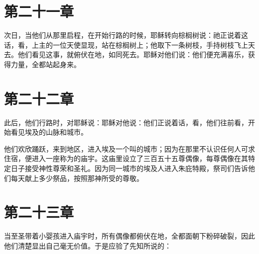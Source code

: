 \section{第二十一章}

次日，当他们从那里启程，在开始行路的时候，耶稣转向棕榈树说：祂正说着这话，看，上主的一位天使显现，站在棕榈树上；他取下一条树枝，手持树枝飞上天去。他们看见这事，就俯伏在地，如同死去。耶稣对他们说：他们便充满喜乐，获得力量，全都站起身来。\par


\section{第二十二章}

此后，他们行路时，对耶稣说：耶稣对他说：他们正说着话，看，他们往前看，开始看见埃及的山脉和城市。\par

他们欢欣踊跃，来到地区，进入埃及一个叫的城市；因为在那里不认识任何人可求住宿，便进入一座称为的庙宇。这庙里设立了三百五十五尊偶像，每尊偶像在其特定日子接受神性尊荣和圣礼。因为同一城市的埃及人进入朱庇特殿，祭司们告诉他们每天献上多少祭品，按照那神所受的尊敬。\par


\section{第二十三章}

当至圣带着小婴孩进入庙宇时，所有偶像都俯伏在地，全都面朝下粉碎破裂，因此他们清楚显出自己毫无价值。于是应验了先知所说的：\par


